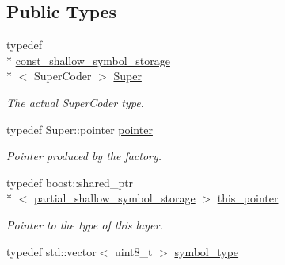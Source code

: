 \subsection*{Public Types}
\begin{DoxyCompactItemize}
\item 
\hypertarget{classkodo_1_1partial__shallow__symbol__storage_a70a1b5d598f651f614687cf18de48e2f}{typedef \\*
\hyperlink{classkodo_1_1const__shallow__symbol__storage}{const\-\_\-shallow\-\_\-symbol\-\_\-storage}\\*
$<$ Super\-Coder $>$ \hyperlink{classkodo_1_1partial__shallow__symbol__storage_a70a1b5d598f651f614687cf18de48e2f}{Super}}\label{classkodo_1_1partial__shallow__symbol__storage_a70a1b5d598f651f614687cf18de48e2f}

\begin{DoxyCompactList}\small\item\em The actual Super\-Coder type. \end{DoxyCompactList}\item 
\hypertarget{classkodo_1_1partial__shallow__symbol__storage_ad226c9507d108004235aa85c5cbdc319}{typedef Super\-::pointer \hyperlink{classkodo_1_1partial__shallow__symbol__storage_ad226c9507d108004235aa85c5cbdc319}{pointer}}\label{classkodo_1_1partial__shallow__symbol__storage_ad226c9507d108004235aa85c5cbdc319}

\begin{DoxyCompactList}\small\item\em Pointer produced by the factory. \end{DoxyCompactList}\item 
\hypertarget{classkodo_1_1partial__shallow__symbol__storage_a09fcd1f54a3ffb162ec104c99a7a5333}{typedef boost\-::shared\-\_\-ptr\\*
$<$ \hyperlink{classkodo_1_1partial__shallow__symbol__storage}{partial\-\_\-shallow\-\_\-symbol\-\_\-storage} $>$ \hyperlink{classkodo_1_1partial__shallow__symbol__storage_a09fcd1f54a3ffb162ec104c99a7a5333}{this\-\_\-pointer}}\label{classkodo_1_1partial__shallow__symbol__storage_a09fcd1f54a3ffb162ec104c99a7a5333}

\begin{DoxyCompactList}\small\item\em Pointer to the type of this layer. \end{DoxyCompactList}\item 
\hypertarget{classkodo_1_1partial__shallow__symbol__storage_a491e576e9bbf42a70802d3e0cc694551}{typedef std\-::vector$<$ uint8\-\_\-t $>$ \hyperlink{classkodo_1_1partial__shallow__symbol__storage_a491e576e9bbf42a70802d3e0cc694551}{symbol\-\_\-type}}\label{classkodo_1_1partial__shallow__symbol__storage_a491e576e9bbf42a70802d3e0cc694551}


\end{DoxyCompactItemize}
